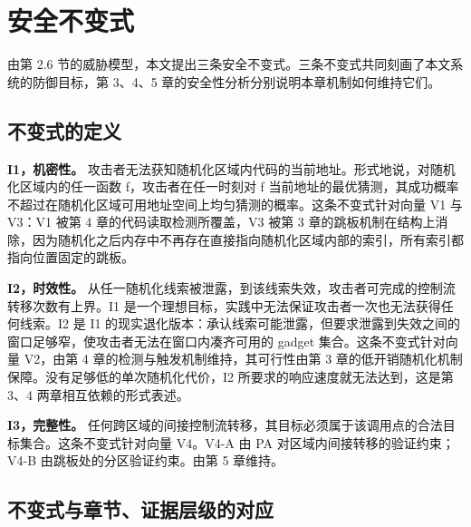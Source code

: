 \section{安全不变式}

由第 2.6 节的威胁模型，本文提出三条安全不变式。三条不变式共同刻画了本文系统的防御目标，第 3、4、5 章的安全性分析分别说明本章机制如何维持它们。

\subsection{不变式的定义}

\textbf{I1，机密性。} 攻击者无法获知随机化区域内代码的当前地址。形式地说，对随机化区域内的任一函数 f，攻击者在任一时刻对 f 当前地址的最优猜测，其成功概率不超过在随机化区域可用地址空间上均匀猜测的概率。这条不变式针对向量 V1 与 V3：V1 被第 4 章的代码读取检测所覆盖，V3 被第 3 章的跳板机制在结构上消除，因为随机化之后内存中不再存在直接指向随机化区域内部的索引，所有索引都指向位置固定的跳板。

\textbf{I2，时效性。} 从任一随机化线索被泄露，到该线索失效，攻击者可完成的控制流转移次数有上界。I1 是一个理想目标，实践中无法保证攻击者一次也无法获得任何线索。I2 是 I1 的现实退化版本：承认线索可能泄露，但要求泄露到失效之间的窗口足够窄，使攻击者无法在窗口内凑齐可用的 gadget 集合。这条不变式针对向量 V2，由第 4 章的检测与触发机制维持，其可行性由第 3 章的低开销随机化机制保障。没有足够低的单次随机化代价，I2 所要求的响应速度就无法达到，这是第 3、4 两章相互依赖的形式表述。

\textbf{I3，完整性。} 任何跨区域的间接控制流转移，其目标必须属于该调用点的合法目标集合。这条不变式针对向量 V4。V4-A 由 PA 对区域内间接转移的验证约束；V4-B 由跳板处的分区验证约束。由第 5 章维持。

\subsection{不变式与章节、证据层级的对应}


